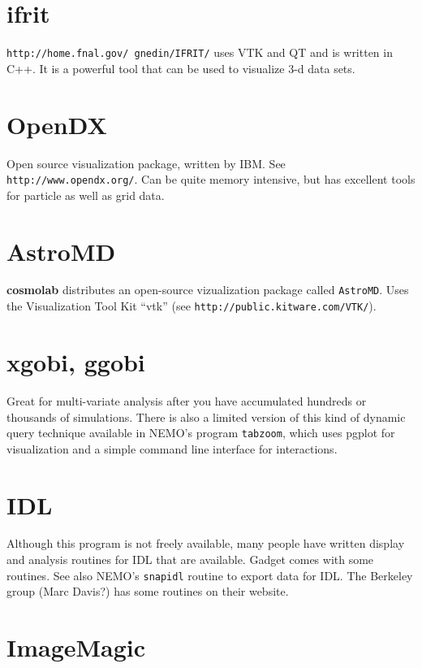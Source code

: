 \section{ifrit}

{\tt http://home.fnal.gov/~gnedin/IFRIT/}
uses VTK and QT and is
written in C++. It is a powerful
tool that can be used to visualize 3-d data sets.

\section{OpenDX}

Open source visualization package, written by IBM. See 
{\tt http://www.opendx.org/}. Can be quite memory intensive, but has
excellent tools for particle as well as grid data.

\section{AstroMD}

{\bf cosmolab} distributes an open-source vizualization package 
called {\tt AstroMD}.  Uses the Visualization Tool Kit ``vtk''
(see {\tt http://public.kitware.com/VTK/}).

\section{xgobi, ggobi}

Great for multi-variate analysis after you have accumulated hundreds
or thousands of simulations. There is also a limited version of
this kind of dynamic query technique available in 
NEMO's program {\tt tabzoom}, which uses pgplot for visualization
and a simple command line interface for interactions.


\section{IDL}

Although this program is not freely available, 
many people have written display and 
analysis routines for IDL that are available.
Gadget comes with some
routines. See also NEMO's {\tt snapidl} routine to export data for IDL.
The Berkeley group (Marc Davis?) has some routines on their website.


\section{ImageMagic}


